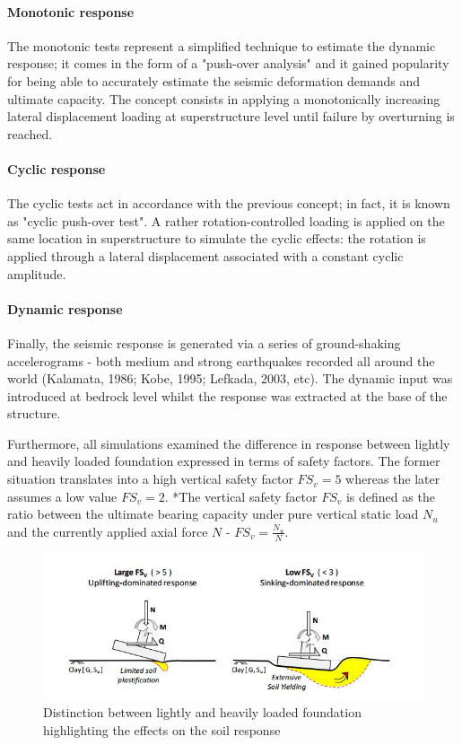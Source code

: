 \documentclass[12pt,a4paper]{report}
\begin{document}
\paragraph{Monotonic response}
The monotonic tests represent a simplified technique to estimate the dynamic response; it comes in the form of a "push-over analysis" and it gained popularity for being able to accurately estimate the seismic deformation demands and ultimate capacity. The concept consists in applying a monotonically increasing lateral displacement loading at superstructure level until failure by overturning is reached. 

\paragraph{Cyclic response}
The cyclic tests act in accordance with the previous concept; in fact, it is known as "cyclic push-over test". A rather rotation-controlled loading is applied on the same location in superstructure to simulate the cyclic effects: the rotation is applied through a lateral displacement associated with a constant cyclic amplitude.

\paragraph{Dynamic response}
Finally, the seismic response is generated via a series of ground-shaking accelerograms - both medium and strong earthquakes recorded all around the world (Kalamata, 1986; Kobe, 1995; Lefkada, 2003, etc). The dynamic input was introduced at bedrock level whilst the response was extracted at the base of the structure.

Furthermore, all simulations examined the difference in response between lightly and heavily loaded foundation expressed in terms of safety factors. The former situation translates into a high vertical safety factor $FS_v=5$ whereas the later assumes a low value $FS_v=2$. *The vertical safety factor $FS_v$ is defined as the ratio between the ultimate bearing capacity under pure vertical static load $N_u$ and the currently applied axial force $N$ - $FS_v = \frac{N_u}{N}$. 

\begin{figure}[h!]
	\centering
	\includegraphics[width=0.8\linewidth]{"largeFS"}
	\caption{Distinction between lightly and heavily loaded foundation highlighting the effects on the soil response}
	\label{largeFS}
\end{figure}
\end{document}
